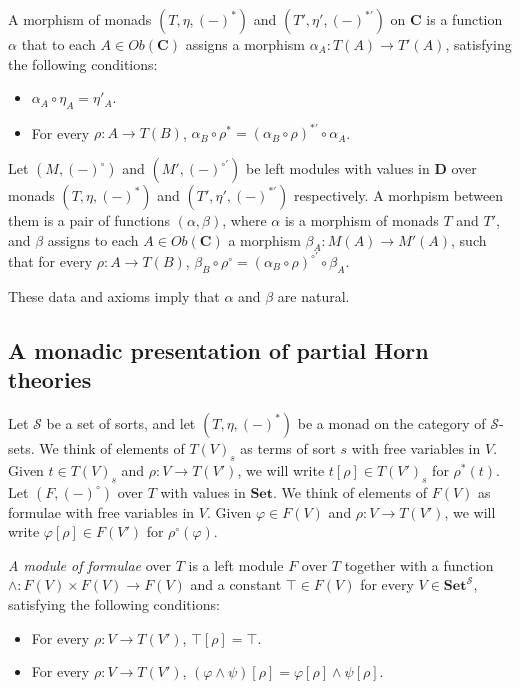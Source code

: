 \documentclass[reqno]{amsart}
\theoremstyle{definition}
\theoremstyle{remark}
\newcommand{\cat}[1]{\mathbf{#1}}
\newcommand{\C}{\cat{C}}
\newcommand{\D}{\cat{D}}
\newcommand{\Set}{\cat{Set}}
\numberwithin{figure}{section}
\begin{document}
\begin{defn}
A morphism of monads $(T,\eta,(-)^*)$ and $(T',\eta',(-)^{*'})$ on $\C$ is a function $\alpha$ that to each $A \in Ob(\C)$ assigns a morphism $\alpha_A : T(A) \to T'(A)$,
satisfying the following conditions:
\begin{itemize}
\item $\alpha_A \circ \eta_A = \eta'_A$.
\item For every $\rho : A \to T(B)$, $\alpha_B \circ \rho^* = (\alpha_B \circ \rho)^{*'} \circ \alpha_A$.
\end{itemize}

Let $(M,(-)^\circ)$ and $(M',(-)^{\circ'})$ be left modules with values in $\D$ over monads $(T,\eta,(-)^*)$ and $(T',\eta',(-)^{*'})$ respectively.
A morhpism between them is a pair of functions $(\alpha,\beta)$, where $\alpha$ is a morphism of monads $T$ and $T'$,
and $\beta$ assigns to each $A \in Ob(\C)$ a morphism $\beta_A : M(A) \to M'(A)$,
such that for every $\rho : A \to T(B)$, $\beta_B \circ \rho^\circ = (\alpha_B \circ \rho)^{\circ'} \circ \beta_A$.
\end{defn}
These data and axioms imply that $\alpha$ and $\beta$ are natural.

\subsection{A monadic presentation of partial Horn theories}

Let $\mathcal{S}$ be a set of sorts, and let $(T,\eta,(-)^*)$ be a monad on the category of $\mathcal{S}$-sets.
We think of elements of $T(V)_s$ as terms of sort $s$ with free variables in $V$.
Given $t \in T(V)_s$ and $\rho : V \to T(V')$, we will write $t[\rho] \in T(V')_s$ for $\rho^*(t)$.
Let $(F,(-)^\circ)$ over $T$ with values in $\Set$.
We think of elements of $F(V)$ as formulae with free variables in $V$.
Given $\varphi \in F(V)$ and $\rho : V \to T(V')$, we will write $\varphi[\rho] \in F(V')$ for $\rho^\circ(\varphi)$.

\emph{A module of formulae} over $T$ is a left module $F$ over $T$ together with a function
    $\land : F(V) \times F(V) \to F(V)$ and a constant $\top \in F(V)$ for every $V \in \Set^\mathcal{S}$, satisfying the following conditions:
\begin{itemize}
\item For every $\rho : V \to T(V')$, $\top[\rho] = \top$.
\item For every $\rho : V \to T(V')$, $(\varphi \land \psi)[\rho] = \varphi[\rho] \land \psi[\rho]$.
\end{itemize}
\end{document}
